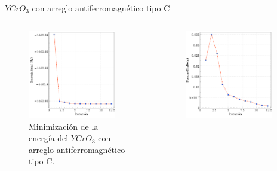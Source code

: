 \begin{frame}{$YCrO_{3}$ con arreglo antiferromagn\'etico tipo C}
    \begin{columns}[t]
        \begin{figure}[H]
            \centering
            \includegraphics[width=0.9\textwidth]{contenido/resultados/img_resultados/energia_YCO_C.png}
            \caption{Minimizaci\'on de la energ\'ia del $YCrO_{3}$ con arreglo 
                antiferromagn\'etico tipo C.}
        \end{figure}
        \begin{figure}[H]
            \centering
            \includegraphics[width=0.9\textwidth]{contenido/resultados/img_resultados/fuerza_YCO_C.png}

\end{figure}
\end{columns}
\end{frame}
